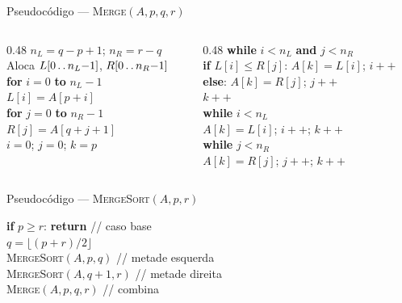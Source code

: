 \documentclass[aspectratio=169]{beamer}
\newcommand{\twodots}{\mathinner{\ldotp\ldotp}}
\begin{document}
\begin{frame}{Pseudocódigo --- \textsc{Merge}$(A, p, q, r)$}
\small
\begin{columns}[T]
\begin{column}{0.48\textwidth}
$n_L = q - p + 1$; \; $n_R = r - q$\\[2pt]
Aloca $L[0\twodots n_L{-}1]$, $R[0\twodots n_R{-}1]$\\[2pt]
\textbf{for} $i = 0$ \textbf{to} $n_L{-}1$\\
\quad $L[i] = A[p + i]$\\[2pt]
\textbf{for} $j = 0$ \textbf{to} $n_R{-}1$\\
\quad $R[j] = A[q + j + 1]$\\[2pt]
$i = 0$; $j = 0$; $k = p$
\end{column}
\begin{column}{0.48\textwidth}
\textbf{while} $i < n_L$ \textbf{and} $j < n_R$\\
\quad \textbf{if} $L[i] \leq R[j]$: $A[k] = L[i]$; $i{+}{+}$\\
\quad \textbf{else}: $A[k] = R[j]$; $j{+}{+}$\\
\quad $k{+}{+}$\\[4pt]
\textbf{while} $i < n_L$\\
\quad $A[k] = L[i]$; $i{+}{+}$; $k{+}{+}$\\[2pt]
\textbf{while} $j < n_R$\\
\quad $A[k] = R[j]$; $j{+}{+}$; $k{+}{+}$
\end{column}
\end{columns}
\end{frame}


\begin{frame}{Pseudocódigo --- \textsc{MergeSort}$(A, p, r)$}
\vspace{0.5cm}
\begin{center}
\begin{minipage}{0.55\textwidth}
\textbf{if} $p \geq r$: \textbf{return} \hfill \textcolor{mblack!50}{\footnotesize// caso base}\\[6pt]
$q = \lfloor (p + r) / 2 \rfloor$\\[6pt]
\textsc{MergeSort}$(A, p, q)$ \hfill \textcolor{mblack!50}{\footnotesize// metade esquerda}\\[4pt]
\textsc{MergeSort}$(A, q+1, r)$ \hfill \textcolor{mblack!50}{\footnotesize// metade direita}\\[4pt]
\textsc{Merge}$(A, p, q, r)$ \hfill \textcolor{mblack!50}{\footnotesize// combina}
\end{minipage}
\end{center}
\end{frame}
\end{document}
